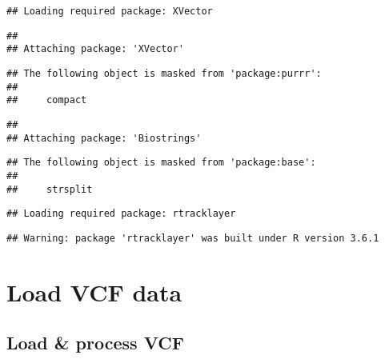 \documentclass[]{article}
\newenvironment{Shaded}{\begin{snugshade}}{\end{snugshade}}
\newcommand{\CommentTok}[1]{\textcolor[rgb]{0.56,0.35,0.01}{\textit{#1}}}
\newcommand{\DataTypeTok}[1]{\textcolor[rgb]{0.13,0.29,0.53}{#1}}
\newcommand{\KeywordTok}[1]{\textcolor[rgb]{0.13,0.29,0.53}{\textbf{#1}}}
\newcommand{\NormalTok}[1]{#1}
\newcommand{\OperatorTok}[1]{\textcolor[rgb]{0.81,0.36,0.00}{\textbf{#1}}}
\begin{document}
\begin{verbatim}
## Loading required package: XVector
\end{verbatim}

\begin{verbatim}
## 
## Attaching package: 'XVector'
\end{verbatim}

\begin{verbatim}
## The following object is masked from 'package:purrr':
## 
##     compact
\end{verbatim}

\begin{verbatim}
## 
## Attaching package: 'Biostrings'
\end{verbatim}

\begin{verbatim}
## The following object is masked from 'package:base':
## 
##     strsplit
\end{verbatim}

\begin{verbatim}
## Loading required package: rtracklayer
\end{verbatim}

\begin{verbatim}
## Warning: package 'rtracklayer' was built under R version 3.6.1
\end{verbatim}

\begin{Shaded}
\end{Shaded}

\hypertarget{load-vcf-data}{%
\section{Load VCF data}\label{load-vcf-data}}

\hypertarget{load-process-vcf}{%
\subsection{Load \& process VCF}\label{load-process-vcf}}
\end{document}

